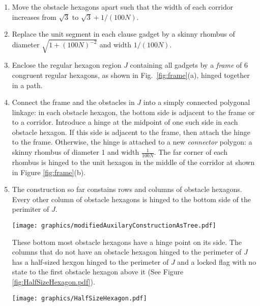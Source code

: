 \documentclass[10pt]{CSUNthesis}
\theoremstyle{plain}%
\theoremstyle{definition}
\theoremstyle{remark}
\newcommand{\lr}[1]{\left( #1 \right)}
\begin{document}
\begin{enumerate}
\item Move the obstacle hexagons apart such that the width of each corridor increases from $\sqrt{3}$ to $\sqrt{3}+1/(100N)$.
\item Replace the unit segment in each clause gadget by a skinny rhombus of diameter $\sqrt{1 + \lr{100N}^{-2}}$ and width $1/(100N)$.
\item Enclose the regular hexagon region $J$ containing all gadgets by a \emph{frame} of 6 congruent regular hexagons, as shown in Fig.~\ref{fig:frame}(a), hinged together in a path.

\item Connect the frame and the obstacles in $J$ into a simply connected polygonal linkage: in each obstacle
hexagon, the bottom side is adjacent to the frame or to a corridor.
Introduce a hinge at the midpoint of one such side in each obstacle hexagon. 
If this side is adjacent to the frame, then attach the hinge to the frame. 
Otherwise, the hinge is attached to a new \emph{connector} polygon: a skinny rhombus of diameter 1 and width $\frac{1}{100N}$. 
The far corner of each rhombus is hinged to the unit hexagon in the middle of the corridor at shown in Figure \ref{fig:frame}(b).
\item The construction so far constains rows and columns of obstacle hexagons.
Every other column of obstacle hexagons is hinged to the bottom side of the perimiter of $J$.

\begin{minipage}{\linewidth}
\begin{center}
\texttt{[image: graphics/modifiedAuxilaryConstructionAsTree.pdf]}
\label{fig:modifiedAuxilaryConstructionAsTree.pdf}
\end{center}
\end{minipage}

These bottom most obstacle hexagons have a hinge point on its side.
The columns that do not have an obstacle hexagon hinged to the perimeter of $J$ has a half-sized hexgon hinged to the perimeter of $J$ and a locked flag with no state to the first obstacle hexagon above it (See Figure \ref{fig:HalfSizeHexagon.pdf}).

\begin{minipage}{\linewidth}
\begin{center}
\texttt{[image: graphics/HalfSizeHexagon.pdf]}
\label{fig:HalfSizeHexagon.pdf}
\end{center}
\end{minipage}
\end{enumerate}
\end{document}
